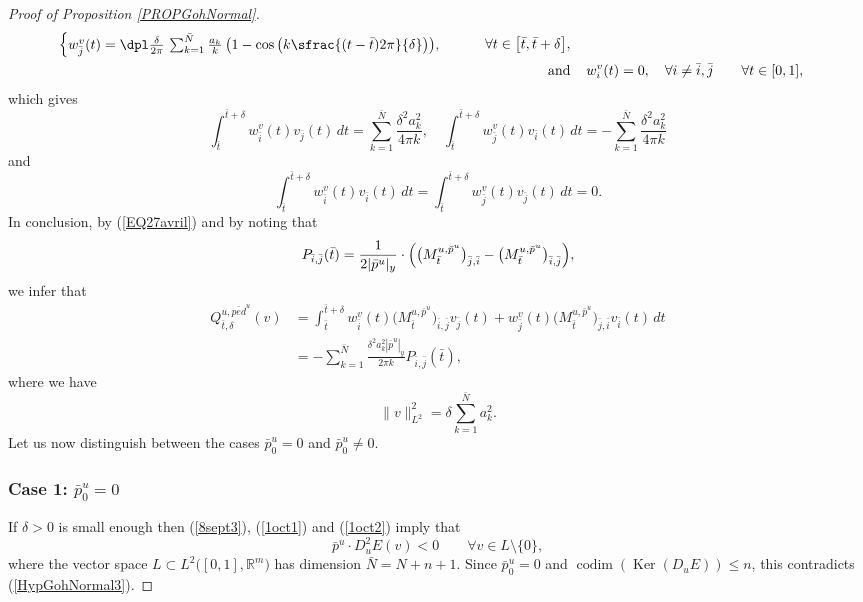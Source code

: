\documentclass[JEP,XML,SOM,Unicode,NoFloatCountersInSection,published]{cedram}
\DeclareMathOperator{\codim}{codim}
\DeclareMathOperator{\Ker}{Ker}
\newcommand\R{\mathbb R}
\theoremstyle{definition}
\begin{document}
\begin{proof}[Proof of Proposition \ref{PROPGohNormal}]
\begin{align*}
\begin{cases}
w^v_{\bar{j}}(t) = \dpl\frac{\delta}{2\pi} \, \sum_{k=1}^{\bar{N}} \frac{a_k}{k}\, \bigl(1 - \cos \left(k \sfrac{(t-\bar{t}) 2\pi}{\delta}\right) \bigr),
\end{cases}
\qquad \forall t \in \bigl[ \bar{t},\bar{t}+\delta\bigr],\\
\tag*{and} &\hspace*{4mm} w^v_i(t) =0, \quad \forall i\neq \bar{i},\bar{j} \qquad \forall t \in [0,1],
\end{align*}
which gives
\[
\int_{\bar{t}}^{\bar{t}+\delta} w_{\bar{i}}^v(t) v_{\bar{j}}(t) \, dt = \sum_{k=1}^{\bar{N}} \frac{\delta^2 a_k^2}{4 \pi k}, \quad
\int_{\bar{t}}^{\bar{t}+\delta} w_{\bar{j}}^v(t) v_{\bar{i}}(t) \, dt = - \sum_{k=1}^{\bar{N}} \frac{\delta^2 a_k^2}{4 \pi k}
\]
and
\[
\int_{\bar{t}}^{\bar{t}+\delta} w_{\bar{i}}^v (t) v_{\bar{i}}(t) \, dt = \int_{\bar{t}}^{\bar{t}+\delta} w_{\bar{j}}^v (t) v_{\bar{j}}(t) \, dt=0.
\]
In conclusion, by (\ref{EQ27avril}) and by noting that
\[
P_{\bar{i},\bar{j}} (\bar{t}) = \frac{1}{2|\bar{p}^u|_{y}} \cdot \Bigl(\bigl(M_{\bar{t}}^{u,\bar{p}^u} \bigr)_{\bar{j},\bar{i}} - \bigl(M_{\bar{t}}^{u,\bar{p}^u} \bigr)_{\bar{i},\bar{j}} \Bigr),
\]
we infer that
\begin{equation}\label{1oct1}
\begin{aligned}
Q^{u,\bar{ped}^u}_{\bar{t},\delta}(v)
& =  \int_{\bar{t}}^{\bar{t}+\delta} w^v_{\bar{i}}(t) \bigl(M_{\bar{t}}^{u,\bar{p}^u}\bigr)_{\bar{i},\bar{j}} v_{\bar{j}}(t) + w^v_{\bar{j}}(t) \bigl(M_{\bar{t}}^{u,\bar{p}^u}\bigr)_{\bar{j},\bar{i}} v_{\bar{i}}(t) \, dt\\
& =  - \sum_{k=1}^{\bar{N}} \frac{\delta^2 a_k^2|\bar{p}^u|_{y}}{2 \pi k} P_{\bar{i},\bar{j}} (\bar{t}),
\end{aligned}
\end{equation}
where we have
\begin{equation}\label{1oct2}
\|v\|_{L^2}^2 = \delta \sum_{k=1}^{\bar{N}} a_k^2.
\end{equation}
Let us now distinguish between the cases $\bar{p}_0^u=0$ and $\bar{p}_0^u\neq0$.

\subsubsection*{Case 1: $\bar{p}_0^u=0$}
If $\delta>0$ is small enough then (\ref{8sept3}), (\ref{1oct1}) and (\ref{1oct2}) imply that
\[
\bar{p}^u \cdot D_{u}^2 E (v) < 0 \qquad \forall v \in L\setminus\{0\},
\]
where the vector space $L\subset L^2\bigl([0,1],\R^m\bigr)$ has dimension $\bar{N}=N+n+1$. Since $\bar{p}_0^{u}=0$ and $\codim(\Ker (D_{u}E))\leq n$, this contradicts (\ref{HypGohNormal3}).


\end{proof}
\end{document}
